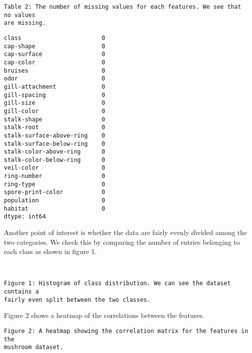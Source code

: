 \documentclass[11pt]{article}
\makeatletter
\newcommand{\boxspacing}{\kern\kvtcb@left@rule\kern\kvtcb@boxsep}
\newcommand{\prompt}[4]{
        {\ttfamily\llap{{\color{#2}[#3]:\hspace{3pt}#4}}\vspace{-\baselineskip}}
    }
\makeatother
\begin{document}
    \begin{Verbatim}[commandchars=\\\{\}]
Table 2: The number of missing values for each features. We see that no values
are missing.
    \end{Verbatim}

            \begin{tcolorbox}[breakable, size=fbox, boxrule=.5pt, pad at break*=1mm, opacityfill=0]
\prompt{Out}{outcolor}{90}{\boxspacing}
\begin{Verbatim}[commandchars=\\\{\}]
class                       0
cap-shape                   0
cap-surface                 0
cap-color                   0
bruises                     0
odor                        0
gill-attachment             0
gill-spacing                0
gill-size                   0
gill-color                  0
stalk-shape                 0
stalk-root                  0
stalk-surface-above-ring    0
stalk-surface-below-ring    0
stalk-color-above-ring      0
stalk-color-below-ring      0
veil-color                  0
ring-number                 0
ring-type                   0
spore-print-color           0
population                  0
habitat                     0
dtype: int64
\end{Verbatim}
\end{tcolorbox}
        
    Another point of interest is whether the data are fairly evenly divided
among the two categories. We check this by comparing the number of
entries belonging to each class as shown in figure 1.


    \begin{center}
    \end{center}
    { \hspace*{\fill} \\}
    
    \begin{Verbatim}[commandchars=\\\{\}]
Figure 1: Histogram of class distribution. We can see the dataset contains a
fairly even split between the two classes.
    \end{Verbatim}

    Figure 2 shows a heatmap of the correlations between the features.
    
\newpage
    \begin{Verbatim}[commandchars=\\\{\}]
Figure 2: A heatmap showing the correlation matrix for the features in the
mushroom dataset.
    \end{Verbatim}
\end{document}

